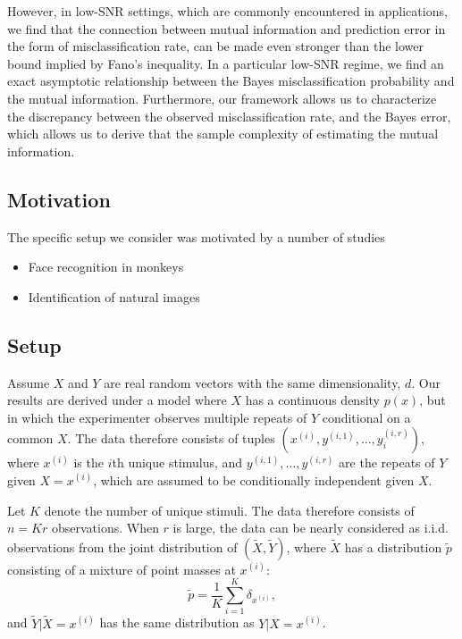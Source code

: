 \documentclass[12pt]{article}
\begin{document}
However, in low-SNR settings, which are commonly encountered in
applications, we find that the connection between mutual information
and prediction error in the form of misclassification rate, can be
made even stronger than the lower bound implied by Fano's inequality.
In a particular low-SNR regime, we find an exact asymptotic
relationship between the Bayes misclassification probability and the
mutual information.  Furthermore, our framework allows us to
characterize the discrepancy between the observed misclassification
rate, and the Bayes error, which allows us to derive that the sample
complexity of estimating the mutual information.

\subsection{Motivation}

The specific setup we consider was motivated by a number of studies
\begin{itemize}
\item Face recognition in monkeys
\item Identification of natural images
\end{itemize}

\subsection{Setup}

Assume $X$ and $Y$ are real random vectors with the same
dimensionality, $d$.  Our results are derived under a model where $X$
has a continuous density $p(x)$, but in which the experimenter
observes multiple repeats of $Y$ conditional on a common $X$.  The
data therefore consists of tuples $(x^{(i)}, y^{(i, 1)}, \hdots,
y_i^{(i, r)})$, where $x^{(i)}$ is the $i$th unique stimulus, and
$y^{(i, 1)},\hdots, y^{(i, r)}$ are the repeats of $Y$ given $X =
x^{(i)}$, which are assumed to be conditionally independent given $X$.

Let $K$ denote the number of unique stimuli.  The data therefore
consists of $n = Kr$ observations.  When $r$ is large, the data can be
nearly considered as i.i.d. observations from the joint distribution
of $(\tilde{X}, \tilde{Y})$, where $\tilde{X}$ has a distribution
$\tilde{p}$ consisting of a mixture of point masses at $x^{(i)}$:
\[
\tilde{p} = \frac{1}{K}\sum_{i=1}^K \delta_{x^{(i)}},
\]
and $\tilde{Y}|\tilde{X} = x^{(i)}$ has the same distribution as $Y|X
= x^{(i)}$.
\end{document}
